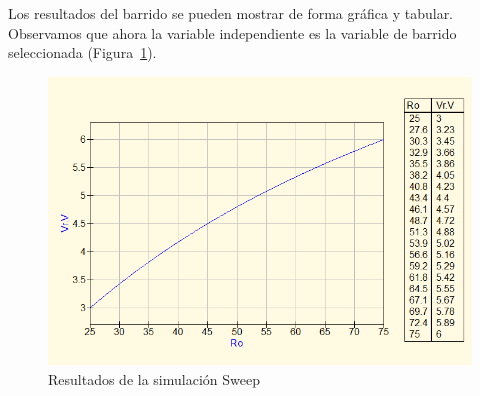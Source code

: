 \documentclass[a4paper,10pt]{article} %
\begin{document}
Los resultados del barrido se pueden mostrar de forma gráfica y tabular. Observamos que ahora la variable independiente es la variable de barrido seleccionada (Figura~\ref{fig.qucs31}).
\begin{figure}[h!]
    \centering
    \includegraphics[width=0.85\linewidth]{../figs/qucs_ResultadosSweep.png}
    \caption{Resultados de la simulación Sweep}
    \label{fig.qucs31}
\end{figure}
\end{document}
